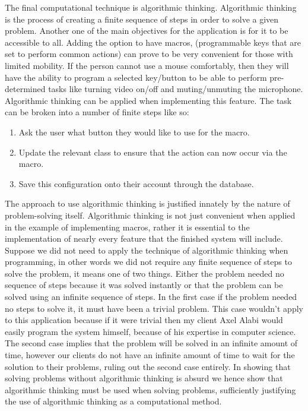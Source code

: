 The final computational technique is algorithmic thinking. 
Algorithmic thinking is the process of creating a finite 
sequence of steps in order to solve a given problem. Another 
one of the main objectives for the application is for it to be
accessible to all. Adding the option to have macros, 
(programmable keys that are set to perform common actions) 
can prove to be very convenient for those with limited
mobility. If the person cannot use a mouse comfortably, then 
they will have the ability to program a selected key/button to 
be able to perform pre-determined tasks like turning video
on/off and muting/unmuting the microphone. Algorithmic thinking
can be applied when implementing this feature. The task can 
be broken into a number of finite steps like so: \\

\begin{enumerate}
  \item Ask the user what button they would like to use for the macro.
  \item Update the relevant class to ensure that the action can now occur via the macro.
  \item Save this configuration onto their account through the database.
\end{enumerate}

The approach to use algorithmic thinking is justified innately
by the nature of problem-solving itself. Algorithmic thinking
is not just convenient when applied in the example of
implementing
macros, rather it is essential to the implementation of nearly
every feature that the finished system will include. Suppose 
we did not need to apply the technique of algorithmic
thinking when programming, in other words we did not require
any finite sequence of steps to solve the problem, it means 
one of two things. Either the problem needed no sequence of 
steps because it was solved instantly or that the problem
can be solved
using an infinite sequence of steps. In the first case if the
problem needed no steps to solve it, it must have been a
trivial problem. This case wouldn't apply to this application
because if it were trivial then my client Axel Alabi would 
easily program the system himself, because of his expertise in 
computer science. The second case implies that the problem will
be solved in an infinite amount of time, however our clients
do not have an infinite amount of time to wait for the 
solution to their problems, ruling out the second case 
entirely. In showing that solving problems without algorithmic
thinking is absurd we hence show that algorithmic thinking
must be used when solving problems, sufficiently justifying 
the use of algorithmic thinking as a computational method.\\
\vspace{0.2cm}


